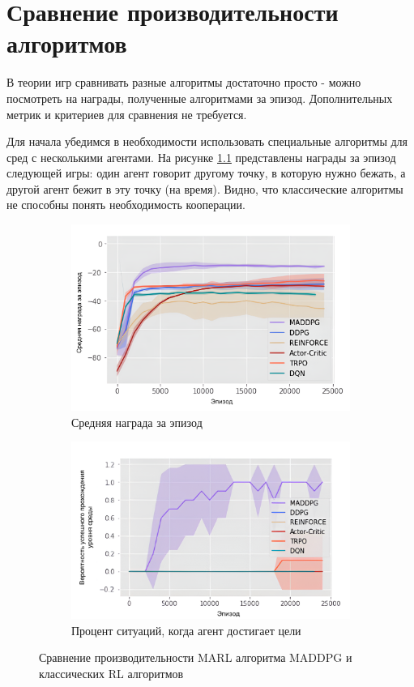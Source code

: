 \chapter{Сравнение производительности алгоритмов}

В теории игр сравнивать разные алгоритмы достаточно просто - можно посмотреть на награды, полученные алгоритмами за эпизод.
Дополнительных метрик и критериев для сравнения не требуется.

Для начала убедимся в необходимости использовать специальные алгоритмы для сред с несколькими агентами.
На рисунке \ref{aboba} \cite{https://doi.org/10.48550/arxiv.1509.02971} представлены награды за эпизод следующей игры: один агент говорит другому точку, в которую нужно бежать, а другой агент бежит в эту точку (на время).
Видно, что классические алгоритмы не способны понять необходимость кооперации.


\begin{figure}[H]
	\centering
	\begin{subfigure}[b]{0.45\textwidth}
		\includegraphics[width=\textwidth]{./inc/img/rl_vs_marl.png}
		\caption{Средняя награда за эпизод}
	\end{subfigure}
	\hfill
	\begin{subfigure}[b]{0.45\textwidth}
		\includegraphics[width=\textwidth]{./inc/img/rl_vs_marl_2.png}
		\caption{Процент ситуаций, когда агент достигает цели}
	\end{subfigure}
		\caption{\centering Сравнение производительности MARL алгоритма MADDPG и классических RL алгоритмов}
	\label{aboba}
\end{figure}



